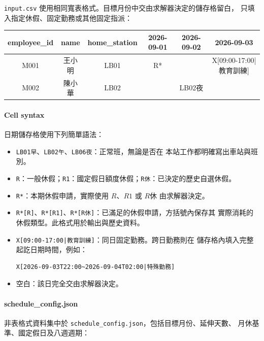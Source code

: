 \documentclass[12pt]{article}
\begin{document}
\texttt{input.csv} 使用相同寬表格式。目標月份中交由求解器決定的儲存格留白，
只填入指定休假、固定勤務或其他固定指派：

\begin{center}
  \footnotesize
  \begin{tabular}{|c|c|c|c|c|c|}
    \hline
    employee\_id & name & home\_station & 2026-09-01 & 2026-09-02 & 2026-09-03 \\
    \hline
    M001 & 王小明 & LB01 & R* & & X[09:00-17:00|教育訓練] \\
    \hline
    M002 & 陳小華 & LB02 & & LB02夜 & \\
    \hline
  \end{tabular}
\end{center}

\paragraph{Cell syntax}

日期儲存格使用下列簡單語法：

\begin{itemize}
  \item \texttt{LB01早}、\texttt{LB02午}、\texttt{LB06夜}：正常班，無論是否在
    本站工作都明確寫出車站與班別。
  \item \texttt{R}：一般休假；\texttt{R1}：國定假日額度休假；\texttt{R休}：已決定的歷史自選休假。
  \item \texttt{R*}：本期休假申請，實際使用 \(R\)、\(R1\) 或 \(R休\) 由求解器決定。
  \item \texttt{R*[R]}、\texttt{R*[R1]}、\texttt{R*[R休]}：已滿足的休假申請，方括號內保存其
    實際消耗的休假類型。此格式用於輸出與歷史資料。
  \item \texttt{X[09:00-17:00|教育訓練]}：同日固定勤務。跨日勤務則在
    儲存格內填入完整起訖日期時間，例如：
  \begin{verbatim}
X[2026-09-03T22:00~2026-09-04T02:00|特殊勤務]
  \end{verbatim}
  \item 空白：該日完全交由求解器決定。
\end{itemize}

\paragraph{schedule\_config.json}

非表格式資料集中於 \texttt{schedule\_config.json}，包括目標月份、延伸天數、
月休基準、國定假日及八週週期：
\end{document}

